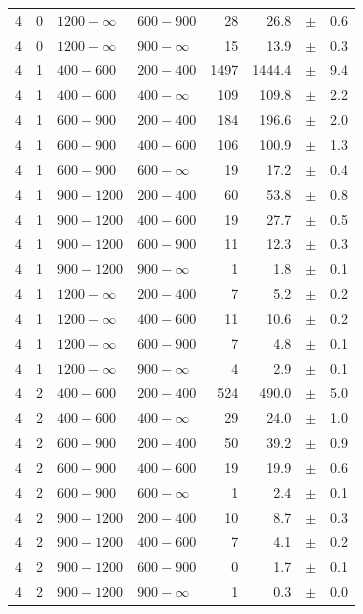 \begin{table}[!h]
\begin{tabular}{rrllrrcl}
4 & 0 & $1200- \infty$ & $600-900$ &     28 &     26.8 &$\pm$&    0.6 \\
4 & 0 & $1200- \infty$ & $900-\infty$ &     15 &     13.9 &$\pm$&    0.3 \\
4\T & 1 & $ 400- 600$ & $200-400$ &   1497 &   1444.4 &$\pm$&    9.4 \\
4 & 1 & $ 400- 600$ & $400-\infty$ &    109 &    109.8 &$\pm$&    2.2 \\
4\T & 1 & $ 600- 900$ & $200-400$ &    184 &    196.6 &$\pm$&    2.0 \\
4 & 1 & $ 600- 900$ & $400-600$ &    106 &    100.9 &$\pm$&    1.3 \\
4 & 1 & $ 600- 900$ & $600-\infty$ &     19 &     17.2 &$\pm$&    0.4 \\
4\T & 1 & $ 900-1200$ & $200-400$ &     60 &     53.8 &$\pm$&    0.8 \\
4 & 1 & $ 900-1200$ & $400-600$ &     19 &     27.7 &$\pm$&    0.5 \\
4 & 1 & $ 900-1200$ & $600-900$ &     11 &     12.3 &$\pm$&    0.3 \\
4 & 1 & $ 900-1200$ & $900-\infty$ &      1 &      1.8 &$\pm$&    0.1 \\
4\T & 1 & $1200- \infty$ & $200-400$ &      7 &      5.2 &$\pm$&    0.2 \\
4 & 1 & $1200- \infty$ & $400-600$ &     11 &     10.6 &$\pm$&    0.2 \\
4 & 1 & $1200- \infty$ & $600-900$ &      7 &      4.8 &$\pm$&    0.1 \\
4 & 1 & $1200- \infty$ & $900-\infty$ &      4 &      2.9 &$\pm$&    0.1 \\
4\T & 2 & $ 400- 600$ & $200-400$ &    524 &    490.0 &$\pm$&    5.0 \\
4 & 2 & $ 400- 600$ & $400-\infty$ &     29 &     24.0 &$\pm$&    1.0 \\
4\T & 2 & $ 600- 900$ & $200-400$ &     50 &     39.2 &$\pm$&    0.9 \\
4 & 2 & $ 600- 900$ & $400-600$ &     19 &     19.9 &$\pm$&    0.6 \\
4 & 2 & $ 600- 900$ & $600-\infty$ &      1 &      2.4 &$\pm$&    0.1 \\
4\T & 2 & $ 900-1200$ & $200-400$ &     10 &      8.7 &$\pm$&    0.3 \\
4 & 2 & $ 900-1200$ & $400-600$ &      7 &      4.1 &$\pm$&    0.2 \\
4 & 2 & $ 900-1200$ & $600-900$ &      0 &      1.7 &$\pm$&    0.1 \\
4 & 2 & $ 900-1200$ & $900-\infty$ &      1 &      0.3 &$\pm$&    0.0 \\

\end{tabular}
\end{table}
